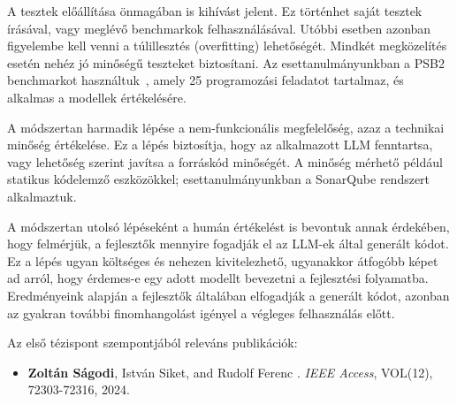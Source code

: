 \documentclass[12pt,a4paper]{extarticle}
\begin{document}
A tesztek előállítása önmagában is kihívást jelent.
Ez történhet saját tesztek írásával, vagy meglévő benchmarkok felhasználásával.
Utóbbi esetben azonban figyelembe kell venni a túlillesztés (overfitting) lehetőségét.
Mindkét megközelítés esetén nehéz jó mi\-nő\-sé\-gű teszteket biztosítani.
Az esettanulmányunkban a PSB2 benchmarkot használtuk~\cite{codegen_benchmark}, amely 25 programozási feladatot tartalmaz, és alkalmas a modellek értékelésére.


A módszertan harmadik lépése a nem-funkcionális megfelelőség, azaz a technikai mi\-nő\-ség értékelése.
Ez a lépés biztosítja, hogy az alkalmazott LLM fenntartsa, vagy lehetőség szerint javítsa a forráskód minőségét.
A minőség mérhető például statikus kódelemző eszközökkel; esettanulmányunkban a SonarQube rendszert alkalmaztuk.

A módszertan utolsó lépéseként a humán értékelést is bevontuk annak érdekében, hogy felmérjük, a fejlesztők mennyire fogadják el az LLM-ek által generált kódot.
Ez a lépés ugyan költséges és nehezen kivitelezhető, ugyanakkor átfogóbb képet ad arról, hogy érdemes-e egy adott modellt bevezetni a fejlesztési folyamatba.
Eredményeink alapján a fejlesztők általában elfogadják a generált kódot, azonban az gyakran további fi\-nom\-han\-go\-lást igényel a végleges felhasználás előtt.


\vspace{2em}
Az első tézispont szempontjából releváns publikációk:
\begin{itemize}
	\item \textbf{Zoltán Ságodi}, István Siket, and Rudolf Ferenc
	.
	\newblock \emph{IEEE Access}, VOL(12), 72303-72316, 2024.
\end{itemize}
\end{document}

